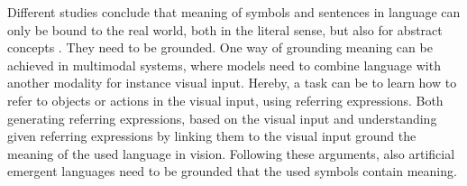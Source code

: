 Different studies conclude that meaning of symbols and sentences in language can only be bound to the real world, both in the literal sense, but also for abstract concepts \citep{Harnad1999,Bender2020,Bisk2020}.
They need to be grounded.
One way of grounding meaning can be achieved in multimodal systems, where models need to combine language with another modality for instance visual input.
Hereby, a task can be to learn how to refer to objects or actions in the visual input, using referring expressions.
Both generating referring expressions, based on the visual input and understanding given referring expressions by linking them to the visual input ground the meaning of the used language in vision.
Following these arguments, also artificial emergent languages need to be grounded that the used symbols contain meaning.


